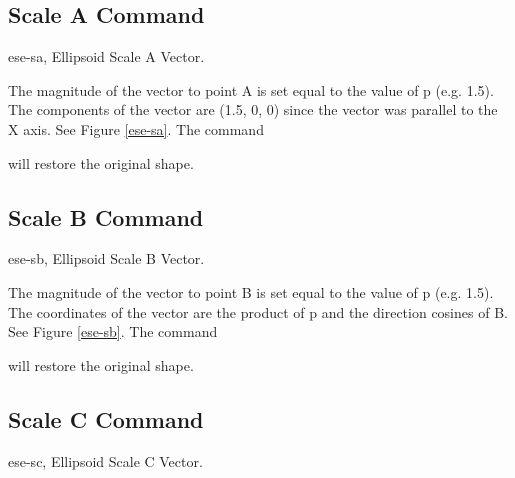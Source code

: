 \subsection{Scale A Command}
\mfig ese-sa, Ellipsoid Scale A Vector.


The magnitude of the vector to point A is set equal to the value of p
(e.g. 1.5).
The components of the vector are (1.5, 0, 0) since the vector was
parallel to the X axis.  See Figure \ref{ese-sa}.  The command


will restore the original shape.

\subsection{Scale B Command}
\mfig ese-sb, Ellipsoid Scale B Vector.


The magnitude of the vector to point B is set equal to the value of p
(e.g. 1.5).
The coordinates of the vector are the product of p and the
direction cosines of B.  See Figure \ref{ese-sb}.  The command


will restore the original shape.

\subsection{Scale C Command}
\mfig ese-sc, Ellipsoid Scale C Vector.


